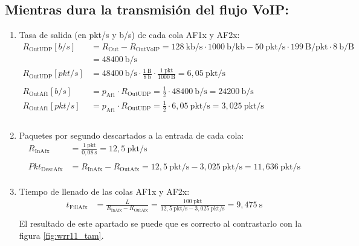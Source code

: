 \subsection{Mientras dura la transmisión del flujo VoIP:}
\begin{enumerate}
    \item Tasa de salida (en pkt/s y b/s) de cada cola AF1x y AF2x: \\
    \[
        \begin{aligned}
            R_{\text{OutUDP}}[b/s] &= R_{\text{Out}} - R_{\text{OutVoIP}} = 128~\text{kb/s} \cdot 1000~\text{b/kb} - 50~\text{pkt/s} \cdot 199~\text{B/pkt} \cdot 8~\text{b/B} \\
                              &= 48400~\text{b/s} \\
            R_{\text{OutUDP}}[pkt/s] &= 48400~\text{b/s} \cdot \frac{1~\text{B}}{8~\text{b}} \cdot \frac{1~\text{pkt}}{1000~\text{B}} = 6,05~\text{pkt/s} \\ \\
            R_{\text{OutAf1}}[b/s] &= p_{\text{Af1}} \cdot R_{\text{OutUDP}} = \frac{1}{2} \cdot 48400~\text{b/s} = 24200~\text{b/s} \\
            R_{\text{OutAf1}}[pkt/s] &= p_{\text{Af1}} \cdot R_{\text{OutUDP}} = \frac{1}{2} \cdot 6,05~\text{pkt/s} = 3,025~\text{pkt/s} \\ \\
        \end{aligned}
    \]
    \item Paquetes por segundo descartados a la entrada de cada cola:
    \[
        \label{eq:udp_paquetes_descartados_con_VoIP}
        \begin{aligned}
            R_{\text{InAfx}} &= \frac{1~\text{pkt}}{0,08~\text{s}} = 12,5~\text{pkt/s} \\ \\
            Pkt_{\text{DescAfx}} &= R_{\text{InAfx}} - R_{\text{OutAfx}} = 12,5~\text{pkt/s} - 3,025~\text{pkt/s} = 11,636~\text{pkt/s} \\
        \end{aligned}
    \]
    \item Tiempo de llenado de las colas AF1x y AF2x:
    \[
        \begin{aligned}
            t_{\text{FillAfx}} &= \frac{L}{R_{\text{InAfx}} - R_{\text{OutAfx}}} = \frac{100~\text{pkt}}{12,5~\text{pkt/s} - 3,025~\text{pkt/s}} = 9,475~\text{s} \\
        \end{aligned}
    \]
    El resultado de este apartado se puede que es correcto al contrastarlo con la figura \ref{fig:wrr11_tam}.

\end{enumerate}


